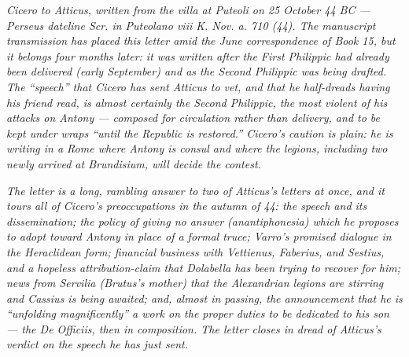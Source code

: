 
\textit{Cicero to Atticus, written from the villa at Puteoli on
25 October 44 BC --- Perseus dateline \textit{Scr. in Puteolano
viii K. Nov. a. 710 (44)}. The manuscript transmission has
placed this letter amid the June correspondence of Book 15, but
it belongs four months later: it was written after the First
Philippic had already been delivered (early September) and as
the Second Philippic was being drafted. The ``speech'' that
Cicero has sent Atticus to vet, and that he half-dreads having
his friend read, is almost certainly the Second Philippic, the
most violent of his attacks on Antony --- composed for
circulation rather than delivery, and to be kept under wraps
``until the Republic is restored.'' Cicero's caution is plain:
he is writing in a Rome where Antony is consul and where the
legions, including two newly arrived at Brundisium, will decide
the contest.}

\textit{The letter is a long, rambling answer to two of Atticus's
letters at once, and it tours all of Cicero's preoccupations in
the autumn of 44: the speech and its dissemination; the
\textit{policy of giving no answer} (\textit{anantiphonesia})
which he proposes to adopt toward Antony in place of a formal
truce; Varro's promised dialogue in the Heraclidean form;
financial business with Vettienus, Faberius, and Sestius, and a
hopeless attribution-claim that Dolabella has been trying to
recover for him; news from Servilia (Brutus's mother) that the
Alexandrian legions are stirring and Cassius is being awaited;
and, almost in passing, the announcement that he is
``unfolding magnificently'' a work on the proper duties to be
dedicated to his son --- the De Officiis, then in composition.
The letter closes in dread of Atticus's verdict on the speech
he has just sent.}
